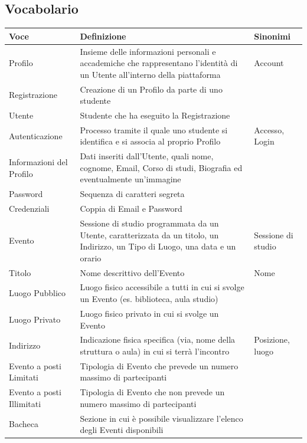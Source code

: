 \documentclass[12pt,a4paper]{report}
\begin{document}
\subsection{Vocabolario}
\begin{tabularx}{\textwidth}{|p{2.8cm}|X|p{2.2cm}|}
    \hline
    \rowcolor{studyColor} \textbf{Voce} & \textbf{Definizione} & \textbf{Sinonimi} \\ \hline
    \endhead
    Profilo & Insieme delle informazioni personali e accademiche che rappresentano l'identità di un Utente all'interno della piattaforma & Account \\ \hline
    Registrazione & Creazione di un Profilo da parte di uno studente & \\ \hline
    Utente & Studente che ha eseguito la Registrazione & \\ \hline
    Autenticazione & Processo tramite il quale uno studente si identifica e si associa al proprio Profilo & Accesso, Login \\ \hline
    Informazioni del Profilo & Dati inseriti dall'Utente, quali nome, cognome, Email, Corso di studi, Biografia ed eventualmente un'immagine & \\ \hline
    Password & Sequenza di caratteri segreta & \\ \hline
    Credenziali & Coppia di Email e Password & \\ \hline
    Evento & Sessione di studio programmata da un Utente, caratterizzata da un titolo, un Indirizzo, un Tipo di Luogo, una data e un orario & Sessione di studio \\ \hline
    Titolo & Nome descrittivo dell'Evento & Nome \\ \hline
    Luogo Pubblico & Luogo fisico accessibile a tutti in cui si svolge un Evento (es. biblioteca, aula studio) & \\ \hline
    Luogo Privato & Luogo fisico privato in cui si svolge un Evento & \\ \hline
    Indirizzo & Indicazione fisica specifica (via, nome della struttura o aula) in cui si terrà l'incontro & Posizione, luogo \\ \hline
    Evento a posti Limitati & Tipologia di Evento che prevede un numero massimo di partecipanti & \\ \hline
    Evento a posti Illimitati & Tipologia di Evento che non prevede un numero massimo di partecipanti & \\ \hline
    Bacheca & Sezione in cui è possibile visualizzare l'elenco degli Eventi disponibili & \\ \hline

\end{tabularx}
\end{document}
